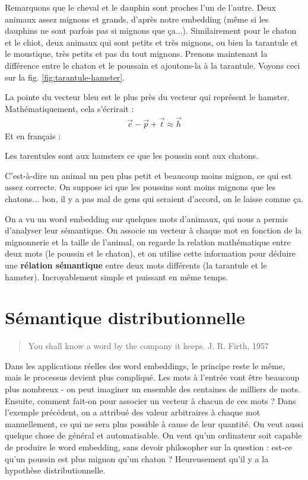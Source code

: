 \documentclass[11pt, a4paper]{report}
\begin{document}
Remarquons que le cheval et le dauphin sont proches l'un de l'autre. Deux animaux assez mignons et grands, 
d'après notre embedding (même si les dauphins ne sont parfois pas si mignons que ça...). Similairement pour 
le chaton et le chiot, deux animaux qui sont petits et très mignons, ou bien la tarantule et le moustique, 
très petits et pas du tout mignons. Prenons maintenant la différence entre le chaton et le poussain et ajoutons-la 
à la tarantule. Voyons ceci sur la fig. \ref{fig:tarantule-hamster}. 

La pointe du vecteur bleu est le plus près du vecteur qui représent le hamster.
Mathématiquement, cela s'écrirait :
\begin{align*}
  \vec{c} - \vec{p} + \vec{t} \approx \vec{h} 
\end{align*}
Et en français : 
\begin{center}
  Les tarentules sont aux hamsters ce que les poussin sont aux chatons. 
\end{center}
C'est-à-dire un animal un peu plus petit et beaucoup moins mignon, ce qui est assez 
correcte. On suppose ici que les poussins sont moins mignons que les chatons... bon, 
il y a pas mal de gens qui seraient d'accord, on le laisse comme ça. 

On a vu un word embedding sur quelques mots d'animaux, qui nous a permis d'analyser leur sémantique.  
On associe un vecteur à chaque mot en fonction de la mignonnerie et la 
taille de l'animal, on regarde la relation mathématique entre deux mots
(le poussin et le chaton), et on utilise cette information pour déduire une \textbf{rélation sémantique} 
entre deux mots différents (la tarantule et le hamster). 
Incroyablement simple et puissant en même temps.


\section{Sémantique distributionnelle}
\begin{quote}
  You shall know a word by the company it keeps. \newline
  J. R. Firth, 1957
\end{quote}
\cite{wikipedia-distributional-semantics} 
\cite{firth-pic}
Dans les applications réelles des word embeddings, le principe reste le même, mais le processus devient plus 
compliqué. Les mots à l'entrée vont être beaucoup plus nombreux - on peut imaginer un ensemble 
des centaines de milliers de mots. Ensuite, comment fait-on pour associer un vecteur à chacun
de ces mots ? Dans l'exemple précédent, on a attribué des valeur arbitraires à chaque mot 
manuellement, ce qui ne sera plus possible à cause de leur quantité. On veut aussi quelque chose de général et 
automatisable. On veut qu'un ordinateur soit capable de produire le word embedding, sans devoir philosopher 
sur la question : est-ce qu'un poussin est plus mignon qu'un chaton ? Heureusement qu'il y a la 
hypothèse distributionnelle. 
\end{document}
